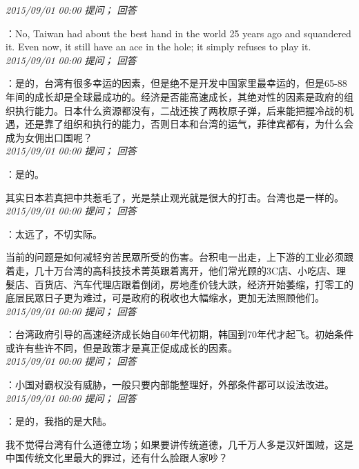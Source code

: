 \documentclass[twocolumn]{ctexart}
\begin{document}
\textit{\hfill\noindent\small 2015/09/01 00:00 提问； 回答}

：No, Taiwan had about the best hand in the world 25 years ago and squandered it. Even now, it still have an ace in the hole; it simply refuses to play it.\\

\textit{\hfill\noindent\small 2015/09/01 00:00 提问； 回答}

：是的，台湾有很多幸运的因素，但是绝不是开发中国家里最幸运的，但是65-88年间的成长却是全球最成功的。经济是否能高速成长，其绝对性的因素是政府的组织执行能力。日本什么资源都没有，二战还挨了两枚原子弹，后来能把握冷战的机遇，还是靠了组织和执行的能力，否则日本和台湾的运气，菲律宾都有，为什么会成为女佣出口国呢？\\

\textit{\hfill\noindent\small 2015/09/01 00:00 提问； 回答}

：是的。

其实日本若真把中共惹毛了，光是禁止观光就是很大的打击。台湾也是一样的。\\

\textit{\hfill\noindent\small 2015/09/01 00:00 提问； 回答}

：太远了，不切实际。

当前的问题是如何减轻穷苦民眾所受的伤害。台积电一出走，上下游的工业必须跟着走，几十万台湾的高科技技术菁英跟着离开，他们常光顾的3C店、小吃店、理髮店、百货店、汽车代理店跟着倒闭，房地產价钱大跌，经济开始萎缩，打零工的底层民眾日子更为难过，可是政府的税收也大幅缩水，更加无法照顾他们。\\

\textit{\hfill\noindent\small 2015/09/01 00:00 提问； 回答}

：台湾政府引导的高速经济成长始自60年代初期，韩国到70年代才起飞。初始条件或许有些许不同，但是政策才是真正促成成长的因素。\\

\textit{\hfill\noindent\small 2015/09/01 00:00 提问； 回答}

：小国对霸权没有威胁，一般只要内部能整理好，外部条件都可以设法改进。\\

\textit{\hfill\noindent\small 2015/09/01 00:00 提问； 回答}

：是的，我指的是大陆。

我不觉得台湾有什么道德立场；如果要讲传统道德，几千万人多是汉奸国贼，这是中国传统文化里最大的罪过，还有什么脸跟人家吵？
\end{document}
